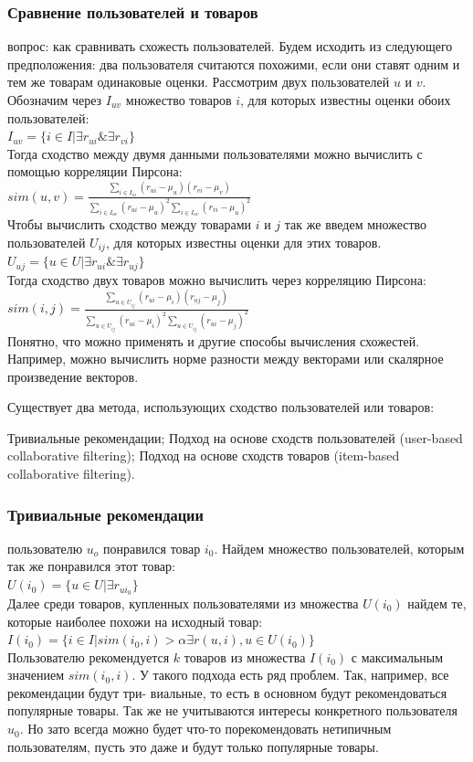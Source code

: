 \documentclass{article}
\newcommand\tab[1][1cm]{\hspace*{#1}}
\begin{document}
\subsubsection*{Сравнение пользователей и товаров}
 вопрос: как сравнивать схожесть пользователей. Будем исходить из следующего предположения: два пользователя считаются похожими, если они ставят одним и тем же товарам одинаковые оценки. Рассмотрим двух пользователей ﻿$u$﻿ и ﻿$v$﻿. Обозначим через ﻿$I_{uv}$ множество товаров ﻿$i$, для которых известны оценки обоих пользователей:\\
$I_{uv}=\{ i\in I | \exists r_{ui} \& \exists r_{vi}\}$\\
Тогда сходство между двумя данными пользователями можно вычислить с помощью корреляции Пирсона:\\
$sim(u,v)=\frac{\sum_{i\in I_{ui}}{(r_{ui}-\mu_u)(r_{vi}-\mu_v)}}{\sum_{i\in I_{uv}}{(r_{ui}-\mu_u)^2}\sum_{i\in I_{uv}}{(r_{vi}-\mu_u)^2}}$\\
Чтобы вычислить сходство между товарами $i$﻿ и ﻿$j$﻿ так же введем множество пользователей ﻿$U_{ij}$﻿, для которых известны оценки для этих товаров.\\
$U_{uj}=\{u\in U|\exists r_{ui} \&\exists r_{uj}\}$\\
Тогда сходство двух товаров можно вычислить через корреляцию Пирсона:\\
$sim(i,j)=\frac{\sum_{u\in U_{ij}}{(r_{ui}-\mu_i)(r_{uj}-\mu_j)}}{\sum_{u\in U_{ij}}{(r_{ui}-\mu_i)^2}\sum_{u\in U_{ij}}{(r_{ui}-\mu_j)^2}}$\\
Понятно, что можно применять и другие способы вычисления схожестей. Например, можно вычислить норме разности между векторами или скалярное произведение векторов.

Существует два метода, использующих сходство пользователей или товаров:

Тривиальные рекомендации;
Подход на основе сходств пользователей (user-based collaborative filtering);
Подход на основе сходств товаров (item-based collaborative filtering).
\subsubsection*{Тривиальные рекомендации}
 пользователю ﻿$u_o$ понравился товар $i_0$. Найдем множество пользователей, которым так же понравился этот товар:\\
$U(i_0)=\{u\in U|\exists r_{ui_0}\}$\\
Далее среди товаров, купленных пользователями из множества ﻿$U(i_0)$ найдем те, которые наиболее похожи на исходный товар:\\
$I(i_0)=\{i\in I|sim(i_0, i)>\alpha \exists r(u, i), u\in U(i_0)\}$\\
Пользователю рекомендуется ﻿$k$ товаров из множества ﻿$I(i_0)$ с максимальным значением $sim(i_0,i)$. У такого подхода есть ряд проблем. Так, например, все рекомендации будут три- виальные, то есть в основном будут рекомендоваться популярные товары. Так же не учитываются интересы конкретного пользователя ﻿$u_0$. Но зато всегда можно будет что-то порекомендовать нетипичным пользователям, пусть это даже и будут только популярные товары.
\end{document}
